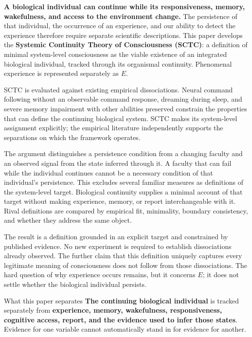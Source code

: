 \documentclass[11pt,letterpaper]{article}
\begin{document}
\begin{abstractcard}
\small
\textbf{A biological individual can continue while its responsiveness, memory, wakefulness, and access to the environment change.} The persistence of that individual, the occurrence of an experience, and our ability to detect the experience therefore require separate scientific descriptions. This paper develops the \textbf{Systemic Continuity Theory of Consciousness (SCTC)}: a definition of minimal system-level consciousness as the viable existence of an integrated biological individual, tracked through its organismal continuity. Phenomenal experience is represented separately as $E$.

SCTC is evaluated against existing empirical dissociations. Neural command following without an observable command response, dreaming during sleep, and severe memory impairment with other abilities preserved constrain the properties that can define the continuing biological system. SCTC makes its system-level assignment explicitly; the empirical literature independently supports the separations on which the framework operates.

The argument distinguishes a persistence condition from a changing faculty and an observed signal from the state inferred through it. A faculty that can fail while the individual continues cannot be a necessary condition of that individual's persistence. This excludes several familiar measures as definitions of the system-level target. Biological continuity supplies a minimal account of that target without making experience, memory, or report interchangeable with it. Rival definitions are compared by empirical fit, minimality, boundary consistency, and whether they address the same object.

The result is a definition grounded in an explicit target and constrained by published evidence. No new experiment is required to establish dissociations already observed. The further claim that this definition uniquely captures every legitimate meaning of consciousness does not follow from those dissociations. The hard question of why experience occurs remains, but it concerns $E$; it does not settle whether the biological individual persists.
\end{abstractcard}

\begin{keybox}{What this paper separates}
\small
\textbf{The continuing biological individual} is tracked separately from \textbf{experience, memory, wakefulness, responsiveness, cognitive access, report, and the evidence used to infer those states}. Evidence for one variable cannot automatically stand in for evidence for another.
\end{keybox}
\end{document}
